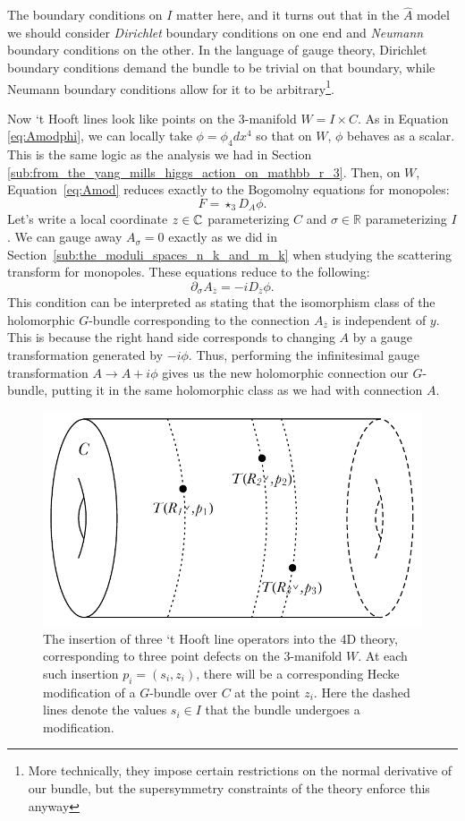 	The boundary conditions on $I$ matter here, and it turns out that in the $\hat A$ model we should consider \emph{Dirichlet} boundary conditions on one end and \emph{Neumann} boundary conditions on the other. In the language of gauge theory, Dirichlet boundary conditions demand the bundle to be trivial on that boundary, while Neumann boundary conditions allow for it to be arbitrary\footnote{More technically, they impose certain restrictions on the normal derivative of our bundle, but the supersymmetry constraints of the theory enforce this anyway}.
	
	Now `t Hooft lines look like points on the 3-manifold $W = I \times C$. As in Equation \ref{eq:Amodphi}, we can locally take $\phi = \phi_4 dx^4$ so that on $W$, $\phi$ behaves as a scalar. This is the same logic as the analysis we had in Section \ref{sub:from_the_yang_mills_higgs_action_on_mathbb_r_3}.
	Then, on $W$, Equation~\eqref{eq:Amod} reduces exactly to the Bogomolny equations for monopoles:
	\[
		F = \star_3 D_A \phi.
	\]
	Let's write a local coordinate $z \in \mathbb{C}$ parameterizing $C$ and $\sigma \in \mathbb R$ parameterizing $I$.
	We can gauge away $A_\sigma = 0$ exactly as we did in Section~\ref{sub:the_moduli_spaces_n_k_and_m_k} when studying the scattering transform for monopoles. These equations reduce to the following:
	\[
		\partial_\sigma A_{\overline z} = - i D_{\overline z} \phi.
	\]
	This condition can be interpreted as stating that the isomorphism class of the holomorphic $G$-bundle corresponding to the connection $A_{\overline z}$ is independent of $y$. This is because the right hand side corresponds to changing $A$ by a gauge transformation generated by $-i \phi$. Thus, performing the infinitesimal gauge transformation $A \to A + i \phi$ gives us the new holomorphic connection our $G$-bundle, putting it in the same holomorphic class as we had with connection $A$.
	
 \begin{figure}
 	\centering
	\includegraphics[scale=0.8]{Figures/Hooft}
	\caption{The insertion of three `t Hooft line operators into the 4D theory, corresponding to three point defects on the 3-manifold $W$. At each such insertion $p_i = (s_i, z_i)$, there will be a corresponding Hecke modification of a $G$-bundle over $C$ at the point $z_i$. Here the dashed lines denote the values $s_i \in I$ that the bundle undergoes a modification.}
	\label{fig:hooft1}
 \end{figure}
	
